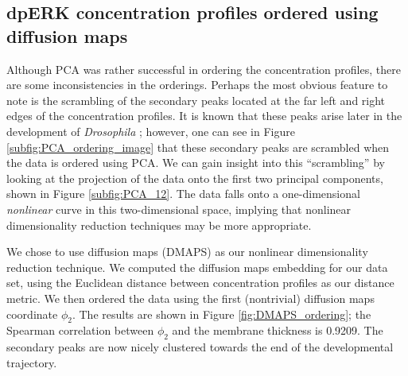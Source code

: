 \documentclass[10pt]{article}
\begin{document}
\subsection*{dpERK concentration profiles ordered using diffusion maps}

Although PCA was rather successful in ordering the concentration profiles, there are some inconsistencies in the orderings.
%
Perhaps the most obvious feature to note is the scrambling of the secondary peaks located at the far left and right edges of the concentration profiles.
%
It is known that these peaks arise later in the development of {\em Drosophila} \cite{...};
however, one can see in Figure \ref{subfig:PCA_ordering_image} that these secondary peaks are scrambled when the data is ordered using PCA.
%
We can gain insight into this ``scrambling'' by looking at the projection of the data onto the first two principal components, shown in Figure \ref{subfig:PCA_12}.
%
The data falls onto a one-dimensional {\em nonlinear} curve in this two-dimensional space, implying that nonlinear dimensionality reduction techniques may be more appropriate.

We chose to use diffusion maps (DMAPS) as our nonlinear dimensionality reduction technique.
%
We computed the diffusion maps embedding for our data set, using the Euclidean distance between concentration profiles as our distance metric.
%
We then ordered the data using the first (nontrivial) diffusion maps coordinate $\phi_2$. 
%
The results are shown in Figure \ref{fig:DMAPS_ordering}; the Spearman correlation between $\phi_2$ and the membrane thickness is 0.9209.
%
The secondary peaks are now nicely clustered towards the end of the developmental trajectory.
\end{document}
